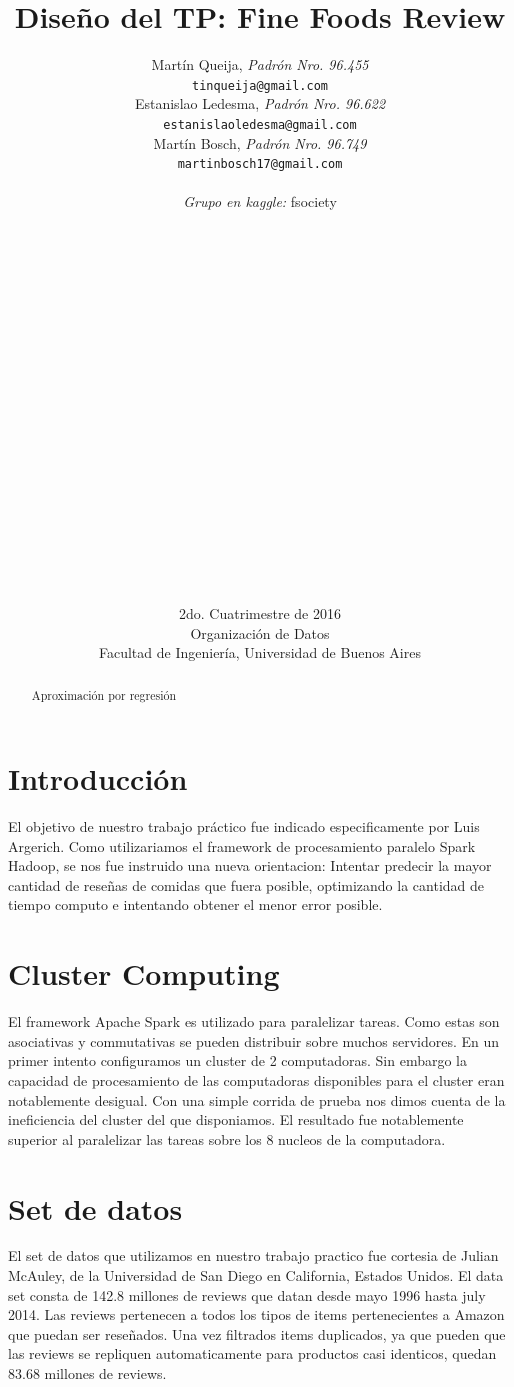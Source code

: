 \documentclass[a4paper,10pt]{article}
\title{	\textbf{Dise\~{n}o del TP: Fine Foods Review} }
\author{
    Mart\'{i}n Queija, \textit{Padr\'{o}n Nro. 96.455} \\
	\texttt{ tinqueija@gmail.com } \\[2.5ex]
	Estanislao Ledesma, \textit{Padr\'{o}n Nro. 96.622} \\
	\texttt{ estanislaoledesma@gmail.com } \\[2.5ex]
	Mart\'{i}n Bosch, \textit{Padr\'{o}n Nro. 96.749} \\
	\texttt{ martinbosch17@gmail.com } \\[2.5ex]
	\\
	\textit{Grupo en kaggle:} fsociety \\
	\\
	\\
	\\
	\\
	\\
	\\
	\\
	\\
	\\
	\\
	\\
	\\
	\\
	\\
	\\
	\\
	\\
	\\
	\\
	\\
	\normalsize{2do. Cuatrimestre de 2016} \\
	\normalsize{ Organizaci\'{o}n de Datos } \\
	\normalsize{ Facultad de Ingenier\'{i}a, Universidad de Buenos Aires } \\
}
\date{}
\begin{document}
	\maketitle
	\thispagestyle{empty}   %


	\begin{abstract}
		\centerline{Aproximaci\'{o}n por regresi\'{o}n}
		
	\end{abstract}
	\newpage
	
	\tableofcontents
	
	
	\section{Introducci\'{o}n}
	
	El objetivo de nuestro trabajo pr\'{a}ctico fue indicado especificamente por Luis Argerich. Como utilizariamos el framework de procesamiento paralelo Spark Hadoop, se nos fue instruido una nueva orientacion: Intentar predecir la mayor cantidad de rese\~{n}as de comidas que fuera posible, optimizando la cantidad de tiempo computo e intentando obtener el menor error posible.
	
	\section{Cluster Computing}
	
	El framework Apache Spark es utilizado para paralelizar tareas. Como estas son asociativas y commutativas se pueden distribuir sobre muchos servidores. En un primer intento configuramos un cluster de 2 computadoras. Sin embargo la capacidad de procesamiento de las computadoras disponibles para el cluster eran notablemente desigual. Con una simple corrida de prueba nos dimos cuenta de la ineficiencia del cluster del que disponiamos. El resultado fue notablemente superior al paralelizar las tareas sobre los 8 nucleos de la computadora.
	
	\section{Set de datos}
	
	El set de datos que utilizamos en nuestro trabajo practico fue cortesia de Julian McAuley, de la Universidad de San Diego en California, Estados Unidos. El data set consta de 142.8 millones de reviews que datan desde mayo 1996 hasta july 2014. Las reviews pertenecen a todos los tipos de items pertenecientes a Amazon que puedan ser rese\~{n}ados. Una vez filtrados items duplicados, ya que pueden que las reviews se repliquen automaticamente para productos casi identicos, quedan 83.68 millones de reviews.
	
\end{document}
